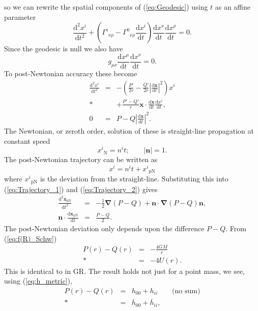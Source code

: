 \documentclass[aps,prd,amsfonts,amssymb,amsmath,nofootinbib,reprint,showpacs]{revtex4-1}
\newcommand{\eqnref}[1]{(\ref{eq:#1})}
\newcommand{\sub}[1]{\ensuremath{_\text{#1}}}
\newcommand{\dd}{\ensuremath{\text{d}}}
\newcommand{\diff}[2]{\ensuremath{\frac{\dd {#1}}{\dd {#2}}}}
\newcommand{\difftwo}[2]{\ensuremath{\frac{\dd^2 {#1}}{\dd {#2}^2}}}
\newcommand{\recip}[1]{\ensuremath{\frac{1}{#1}}}
\newcommand{\grad}{\ensuremath{\boldsymbol{\nabla}}}
\begin{document}
so we can rewrite the spatial components of \eqnref{Geodesic} using $t$ as an affine parameter~\cite{Will1993}
\begin{equation}
\difftwo{x^i}{t} + \left({\Gamma^i}_{\nu\rho} - {\Gamma^0}_{\nu\rho}\diff{x^i}{t}\right)\diff{x^\nu}{t}\diff{x^\rho}{t} = 0.
\end{equation}
Since the geodesic is null we also have
\begin{equation}
g_{\mu\nu}\diff{x^\mu}{t}\diff{x^\nu}{t} = 0.
\end{equation}
To post-Newtonian accuracy these become
\begin{eqnarray}
\label{eq:Trajectory_1}
\difftwo{x^i}{t} & = & -\left(\frac{P'}{2r} - \frac{Q'}{2r}\left|\diff{\boldsymbol{x}}{t}\right|^2\right)x^i \nonumber \\* 
 & & + {} \frac{P' - Q'}{r}\boldsymbol{x}\cdot\diff{\boldsymbol{x}}{t}\diff{x^i}{t}, \\
0 & = & P - Q\left|\diff{\boldsymbol{x}}{t}\right|^2.
\label{eq:Trajectory_2}
\end{eqnarray}
The Newtonian, or zeroth order, solution of these is straight-line propagation at constant speed~\cite{Will1993}
\begin{equation}
x^i\sub{N} = n^it; \qquad |\boldsymbol{n}| = 1.
\end{equation}
The post-Newtonian trajectory can be written as
\begin{equation}
x^i = n^it + x^i\sub{pN}
\end{equation}
where $x^i\sub{pN}$ is the deviation from the straight-line. Substituting this into \eqnref{Trajectory_1} and \eqnref{Trajectory_2} gives
\begin{eqnarray}
\difftwo{\boldsymbol{x}\sub{pN}}{t} & = & -\recip{2}\grad(P - Q) + \boldsymbol{n}\cdot\grad(P - Q)\boldsymbol{n}, \\
\boldsymbol{n}\cdot\diff{\boldsymbol{x}\sub{pN}}{t} & = & \frac{P - Q}{2}.
\end{eqnarray}
The post-Newtonian deviation only depends upon the difference $P - Q$. From \eqnref{f(R)_Schw}
\begin{eqnarray}
P(r) - Q(r) & = & -\frac{4GM}{r} \nonumber \\*
 & = & -4U(r).
\end{eqnarray}
This is identical to in GR. The result holds not just for a point mass, we see, using \eqnref{h_metric},
\begin{eqnarray}
P(r) - Q(r) & = & h_{00} + h_{ii} \qquad \text{(no sum)}\nonumber \\*
 & = & \overline{h}_{00} + \overline{h}_{ii},
\end{eqnarray}
\end{document}
